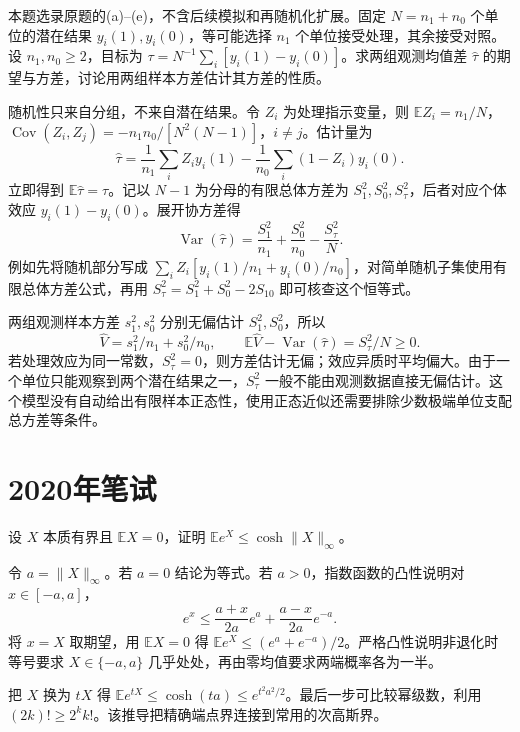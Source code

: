 \documentclass[UTF8,12pt,a4paper,fontset=fandol]{ctexbook}
\newcommand{\E}{\mathbb E}
\DeclareMathOperator{\Var}{Var}
\DeclareMathOperator{\Cov}{Cov}
\begin{document}
\begin{example}[原题4(a)--(e)：完全随机分组的有限总体推断]\label{yau:2019-4}
本题选录原题的(a)--(e)，不含后续模拟和再随机化扩展。固定 $N=n_1+n_0$ 个单位的潜在结果 $y_i(1),y_i(0)$，等可能选择 $n_1$ 个单位接受处理，其余接受对照。设 $n_1,n_0\ge2$，目标为 $\tau=N^{-1}\sum_i[y_i(1)-y_i(0)]$。求两组观测均值差 $\widehat\tau$ 的期望与方差，讨论用两组样本方差估计其方差的性质。
\end{example}
\begin{solve}
随机性只来自分组，不来自潜在结果。令 $Z_i$ 为处理指示变量，则 $\E Z_i=n_1/N$，$\Cov(Z_i,Z_j)=-n_1n_0/[N^2(N-1)]$，$i\ne j$。估计量为
\[
\widehat\tau=\frac1{n_1}\sum_iZ_iy_i(1)-\frac1{n_0}\sum_i(1-Z_i)y_i(0).
\]
立即得到 $\E\widehat\tau=\tau$。记以 $N-1$ 为分母的有限总体方差为 $S_1^2,S_0^2,S_\tau^2$，后者对应个体效应 $y_i(1)-y_i(0)$。展开协方差得
\[
\Var(\widehat\tau)=\frac{S_1^2}{n_1}+\frac{S_0^2}{n_0}-\frac{S_\tau^2}{N}.
\]
例如先将随机部分写成 $\sum_iZ_i[y_i(1)/n_1+y_i(0)/n_0]$，对简单随机子集使用有限总体方差公式，再用 $S_\tau^2=S_1^2+S_0^2-2S_{10}$ 即可核查这个恒等式。

两组观测样本方差 $s_1^2,s_0^2$ 分别无偏估计 $S_1^2,S_0^2$，所以
\[
\widehat V=s_1^2/n_1+s_0^2/n_0,\qquad \E\widehat V-\Var(\widehat\tau)=S_\tau^2/N\ge0.
\]
若处理效应为同一常数，$S_\tau^2=0$，则方差估计无偏；效应异质时平均偏大。由于一个单位只能观察到两个潜在结果之一，$S_\tau^2$ 一般不能由观测数据直接无偏估计。这个模型没有自动给出有限样本正态性，使用正态近似还需要排除少数极端单位支配总方差等条件。
\end{solve}

\section{2020年笔试}
\begin{example}[原题1：有界零均值变量的指数矩]\label{yau:2020-1}
设 $X$ 本质有界且 $\E X=0$，证明 $\E e^X\le\cosh\|X\|_\infty$。
\end{example}
\begin{solve}
令 $a=\|X\|_\infty$。若 $a=0$ 结论为等式。若 $a>0$，指数函数的凸性说明对 $x\in[-a,a]$，
\[
e^x\le\frac{a+x}{2a}e^a+\frac{a-x}{2a}e^{-a}.
\]
将 $x=X$ 取期望，用 $\E X=0$ 得 $\E e^X\le(e^a+e^{-a})/2$。严格凸性说明非退化时等号要求 $X\in\{-a,a\}$ 几乎处处，再由零均值要求两端概率各为一半。

把 $X$ 换为 $tX$ 得 $\E e^{tX}\le\cosh(ta)\le e^{t^2a^2/2}$。最后一步可比较幂级数，利用 $(2k)!\ge2^kk!$。该推导把精确端点界连接到常用的次高斯界。
\end{solve}
\end{document}
